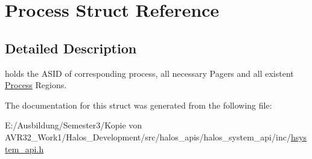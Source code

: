 \hypertarget{struct_process}{
\section{Process Struct Reference}
\label{struct_process}
}


\subsection{Detailed Description}
holds the ASID of corresponding process, all necessary Pagers and all existent \hyperlink{struct_process}{Process} Regions. 

The documentation for this struct was generated from the following file:\begin{CompactItemize}
\item 
E:/Ausbildung/Semester3/Kopie von AVR32\_\-Work1/Halos\_\-Development/src/halos\_\-apis/halos\_\-system\_\-api/inc/\hyperlink{hsystem__api_8h}{hsystem\_\-api.h}\end{CompactItemize}
